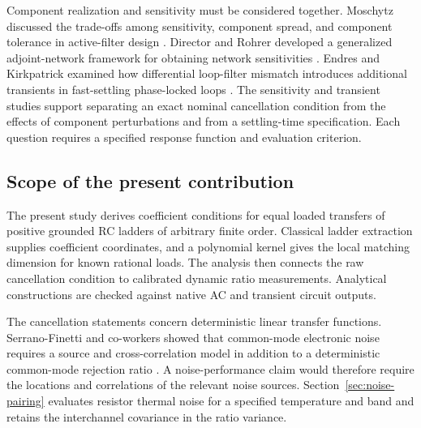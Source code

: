 Component realization and sensitivity must be considered together. Moschytz discussed the trade-offs among sensitivity, component spread, and component tolerance in active-filter design \citep{moschytz0radeffs}. Director and Rohrer developed a generalized adjoint-network framework for obtaining network sensitivities \citep{director1969the}. Endres and Kirkpatrick examined how differential loop-filter mismatch introduces additional transients in fast-settling phase-locked loops \citep{endres0ensitivi}. The sensitivity and transient studies support separating an exact nominal cancellation condition from the effects of component perturbations and from a settling-time specification. Each question requires a specified response function and evaluation criterion.

\subsection{Scope of the present contribution}
The present study derives coefficient conditions for equal loaded transfers of positive grounded RC ladders of arbitrary finite order. Classical ladder extraction supplies coefficient coordinates, and a polynomial kernel gives the local matching dimension for known rational loads. The analysis then connects the raw cancellation condition to calibrated dynamic ratio measurements. Analytical constructions are checked against native AC and transient circuit outputs.

The cancellation statements concern deterministic linear transfer functions. Serrano-Finetti and co-workers showed that common-mode electronic noise requires a source and cross-correlation model in addition to a deterministic common-mode rejection ratio \citep{serranofinetti2019cmnoise}. A noise-performance claim would therefore require the locations and correlations of the relevant noise sources. Section~\ref{sec:noise-pairing} evaluates resistor thermal noise for a specified temperature and band and retains the interchannel covariance in the ratio variance.
